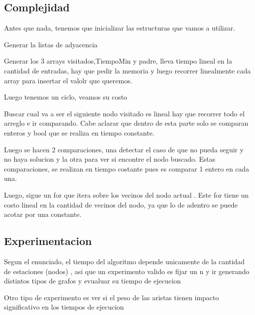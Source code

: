 \subsection{Complejidad}
Antes que nada, tenemos que inicializar las estructuras que vamos a utilizar.

Generar la listas de adyacencia 

Generar los 3 arrays visitados,TiempoMin y padre, lleva tiempo lineal en la cantidad de entradas, hay que pedir la memoria y luego recorrer linealmente cada array para insertar el valolr que queremos.

Luego tenemos un ciclo,  veamos su costo

Buscar cual va a ser el siguiente nodo visitado es lineal hay que recorrer todo el arreglo e ir comparando. Cabe aclarar que dentro de esta parte solo se comparan enteros y bool que se realiza en tiempo constante.

Luego se hacen 2 comparaciones, una detectar el caso de que no pueda seguir y no haya solucion y la otra para ver si encontre el nodo buscado. Estas comparaciones, se realizan en tiempo costante pues es comparar 1 entero en cada una.

Luego,  sigue un for que itera sobre los vecinos del nodo actual . Este for tiene un costo lineal en la cantidad de vecinos del nodo, ya que lo de adentro se puede acotar por una constante.


\subsection{Experimentacion}
Segun el enunciado, el tiempo del algoritmo depende unicamente de la cantidad de estaciones  (nodos) , asi que un experimento valido es fijar un n y ir generando distintos tipos de grafos y evualuar su tiempo de ejecucion

Otro tipo de experimento es ver si el peso de las aristas tienen impacto significativo en los tiempos de ejecucion

